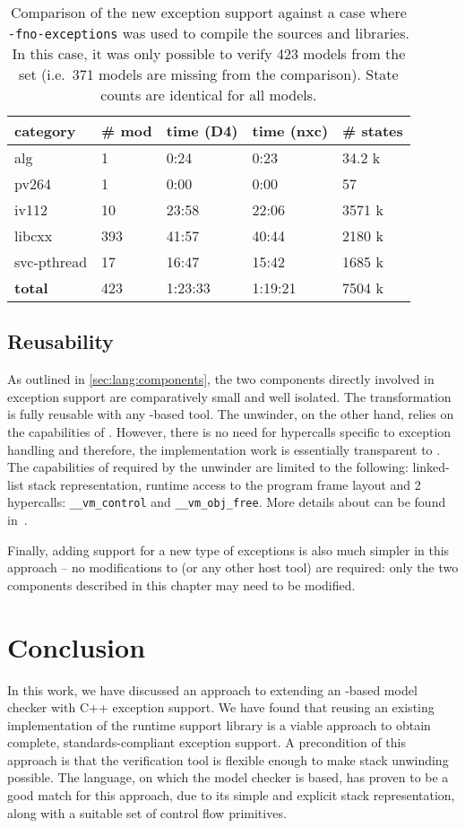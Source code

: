 \begin{table}[tp]
\caption{\label{tbl:D4nxc}Comparison of the new exception support
against a case where \texttt{-fno-exceptions} was used to compile the
sources and libraries. In this case, it was only possible to verify 423
models from the set (i.e.~371 models are missing from the comparison).
State counts are identical for all models. }
\begin{tabularx}{\textwidth}{llLLL}
\toprule
category & \# mod & time (D4) & time (nxc) & \# states\tabularnewline
\midrule
alg & 1 & 0:24 & 0:23 & 34.2 k\tabularnewline
pv264 & 1 & 0:00 & 0:00 & 57\tabularnewline
iv112 & 10 & 23:58 & 22:06 & 3571 k\tabularnewline
libcxx & 393 & 41:57 & 40:44 & 2180 k\tabularnewline
svc-pthread & 17 & 16:47 & 15:42 & 1685 k\tabularnewline
\textbf{total} & 423 & 1:23:33 & 1:19:21 & 7504 k\tabularnewline
\bottomrule
\end{tabularx}
\end{table}

\subsection{Reusability}\label{sec:lang:reusability}

As outlined in \autoref{sec:lang:components}, the two components directly
involved in exception support are comparatively small and well isolated.
The \llvm{} transformation is fully reusable with any \llvm{}-based tool. The
unwinder, on the other hand, relies on the capabilities of \divm{}.
However, there is no need for hypercalls specific to exception handling
and therefore, the implementation work is essentially transparent to
\divm{}. The capabilities of \divm{} required by the unwinder are limited to
the following: linked-list stack representation, runtime access to the
program frame layout and 2 hypercalls:
\texttt{\_\_vm\_control} and \texttt{\_\_vm\_obj\_free}. More details about
\divm{} can be found in~.

Finally, adding support for a new type of exceptions is also much
simpler in this approach -- no modifications to \divm{} (or any other host
tool) are required: only the two components described in this chapter may
need to be modified.

\section{Conclusion}\label{sec:lang:conclusion}

In this work, we have discussed an approach to extending an \llvm{}-based
model checker with C++ exception support. We have found that reusing an
existing implementation of the runtime support library is a viable
approach to obtain complete, standards-compliant exception support. A
precondition of this approach is that the verification tool is flexible
enough to make stack unwinding possible. The \divm{} language, on which the
\divine{} model checker is based, has proven to be a good match for this
approach, due to its simple and explicit stack representation, along
with a suitable set of control flow primitives.

